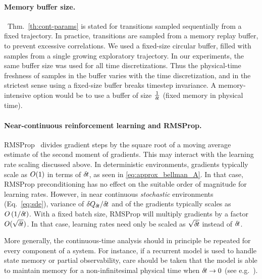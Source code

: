 \paragraph{Memory buffer size.}~Thm.~\ref{th:cont-params} is stated for
transitions sampled sequentially from a fixed trajectory. In practice,
transitions are sampled from a memory replay buffer, to prevent excessive correlations.
We used a fixed-size circular buffer, filled
with samples from a single growing exploratory trajectory. In
our experiments, the same buffer size was used for all time discretizations. 
Thus the physical-time freshness of samples in the buffer varies with the
time discretization, and in the strictest sense using a fixed-size buffer
breaks timestep invariance. A memory-intensive option would be to use a
buffer of size $\frac{1}{{\delta\hspace{-.1em}t}}$ (fixed memory in physical time).

\paragraph{Near-continuous reinforcement learning and RMSProp.}
RMSProp~\cite{rmsprop} divides gradient steps by the square root of a
moving average estimate of the second moment of gradients.
This may interact with the learning rate scaling discussed above. In
deterministic environments, gradients typically scale as $O(1)$ in
terms of ${\delta\hspace{-.1em}t}$, as seen in \eqref{eq:approx_bellman_A}.  In that case, RMSProp
preconditioning has no effect on the suitable order of magnitude for learning
rates. However, in near continuous \emph{stochastic} environments
(Eq.~\ref{eq:sde}), variance of $\delta
Q_{{\delta\hspace{-.1em}t}}/{\delta\hspace{-.1em}t}$ and of the gradients typically scales as
$O\left(1/{\delta\hspace{-.1em}t}\right)$. With a fixed batch size,
RMSProp will multiply gradients by a factor $O(\sqrt{{\delta\hspace{-.1em}t}})$. In
that case,
learning rates need only be scaled as $\sqrt{{\delta\hspace{-.1em}t}}$ instead of
${\delta\hspace{-.1em}t}$.

More generally, the continuous-time analysis should in principle be repeated for every component of  
a system. For instance, if a recurrent model is used to handle state
memory or partial observability, care should be taken that the model is
able to maintain memory for a non-infinitesimal physical time when
${\delta\hspace{-.1em}t}\to 0$ (see e.g.~\citealt{chronornn}).
